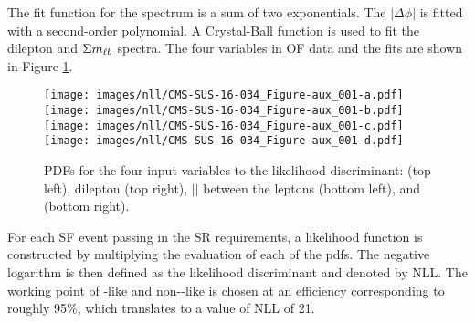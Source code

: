 The fit function for the \ptmiss spectrum is a sum of two exponentials. The $|\Delta\phi|$ is fitted with a second-order polynomial.
A Crystal-Ball function is used to fit the dilepton \pt and $\Sigma m_{\ell b}$ spectra.
The four variables in OF data and the fits are shown in Figure \ref{fig:pdfsNLL}.
\begin{figure}[htbp!] 
\begin{center}
    \texttt{[image: images/nll/CMS-SUS-16-034\_Figure-aux\_001-a.pdf]}
    \texttt{[image: images/nll/CMS-SUS-16-034\_Figure-aux\_001-b.pdf]} \\
    \texttt{[image: images/nll/CMS-SUS-16-034\_Figure-aux\_001-c.pdf]} 
    \texttt{[image: images/nll/CMS-SUS-16-034\_Figure-aux\_001-d.pdf]}
    \caption{PDFs for the four input variables to the likelihood discriminant: \ptmiss (top left), dilepton \pt (top right),
    $|$\dphi$|$ between the leptons (bottom left), and \mlb (bottom right).}
\label{fig:pdfsNLL}
\end{center}
\end{figure}
For each SF event passing in the SR requirements, a likelihood function is constructed by multiplying the evaluation of each of the pdfs.
The negative logarithm is then defined as the likelihood discriminant and denoted by NLL.
The working point of \ttbar-like and non-\ttbar-like is chosen at an efficiency corresponding to roughly 95\%, which translates to a value of NLL of 21.
